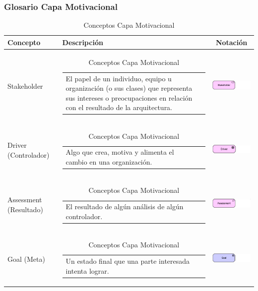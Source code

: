 \newpage

\subsubsection{Glosario Capa Motivacional}

\begin{longtable}[c]{|p{2.5cm}|l|c|}
	\caption{Conceptos Capa Motivacional}
	\label{my-label}\\
	\hline
	\textbf{Concepto} 			& \textbf{Descripción}                                                                                                                                            & \textbf{Notación} \\ \hline
	\endhead
	Stakeholder					& \begin{tabular}[c]{p{7cm}@{}l@{}}El papel de un individuo, equipo u organización (o sus clases) que representa sus intereses o preocupaciones en relación con el resultado de la arquitectura.\end{tabular}                                                    & \includegraphics[width=35mm]{arquitectura/adm_lenguaje/imgs/motivational/Stakeholder}           \\ \hline
	Driver (Controlador)		& \begin{tabular}[c]{p{7cm}@{}l@{}}Algo que crea, motiva y alimenta el cambio en una organización.\end{tabular} & \includegraphics[width=35mm]{arquitectura/adm_lenguaje/imgs/motivational/Diver}          \\ \hline
	Assessment (Resultado)		& \begin{tabular}[c]{p{7cm}@{}l@{}}El resultado de algún análisis de algún controlador.\end{tabular} & \includegraphics[width=35mm]{arquitectura/adm_lenguaje/imgs/motivational/Assessment}          \\ \hline
	Goal (Meta)					& \begin{tabular}[c]{p{7cm}@{}l@{}}Un estado final que una parte interesada intenta lograr.\end{tabular} & \includegraphics[width=35mm]{arquitectura/adm_lenguaje/imgs/motivational/Goal}          \\ \hline

\end{longtable}
